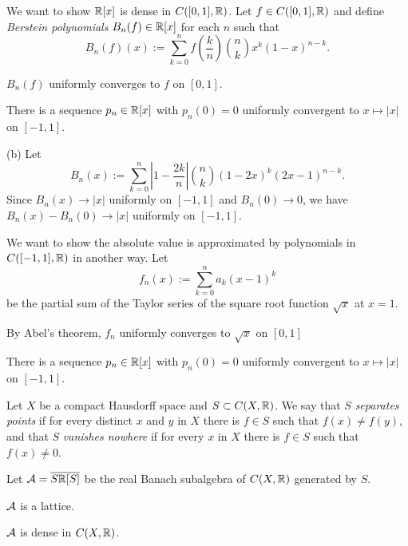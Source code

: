 \documentclass{../../large}
\begin{document}
\begin{prb}
We want to show $\mathbb{R}[x]$ is dense in $C([0,1],\mathbb{R})$.
Let $f\in C([0,1],\mathbb{R})$ and define \emph{Berstein polynomials} $B_n(f)\in\mathbb{R}[x]$ for each $n$ such that
\[B_n(f)(x):=\sum_{k=0}^nf\left(\frac kn\right)\binom nkx^k(1-x)^{n-k}.\]
\begin{parts}
\item $B_n(f)$ uniformly converges to $f$ on $[0,1]$.
\item There is a sequence $p_n\in\mathbb{R}[x]$ with $p_n(0)=0$ uniformly convergent to $x\mapsto|x|$ on $[-1,1]$.
\end{parts}
\end{prb}
\begin{pf}
(b)
Let
\[B_n(x):=\sum_{k=0}^n\left|1-\frac{2k}n\right|\binom nk(1-2x)^k(2x-1)^{n-k}.\]
Since $B_n(x)\to|x|$ uniformly on $[-1,1]$ and $B_n(0)\to0$, we have $B_n(x)-B_n(0)\to|x|$ uniformly on $[-1,1]$.
\end{pf}

\begin{prb}
We want to show the absolute value is approximated by polynomials in $C([-1,1],\mathbb{R})$ in another way.
Let
\[f_n(x):=\sum_{k=0}^n a_k(x-1)^k\]
be the partial sum of the Taylor series of the square root function $\sqrt x$ at $x=1$.
\begin{parts}
\item By Abel's theorem, $f_n$ uniformly converges to $\sqrt x$ on $[0,1]$
\item There is a sequence $p_n\in\mathbb{R}[x]$ with $p_n(0)=0$ uniformly convergent to $x\mapsto|x|$ on $[-1,1]$.
\end{parts}
\end{prb}


\begin{prb}
Let $X$ be a compact Hausdorff space and $S\subset C(X,\mathbb{R})$.
We say that $S$ \emph{separates points} if for every distinct $x$ and $y$ in $X$ there is $f\in S$ such that $f(x)\ne f(y)$, and that $S$ \emph{vanishes nowhere} if for every $x$ in $X$ there is $f\in S$ such that $f(x)\ne0$.

Let $\mathcal{A}=\overline{S\mathbb{R}[S]}$ be the real Banach subalgebra of $C(X,\mathbb{R})$ generated by $S$.
\begin{parts}
\item $\mathcal{A}$ is a lattice.
\item $\mathcal{A}$ is dense in $C(X,\mathbb{R})$.
\end{parts}
\end{prb}
\end{document}

